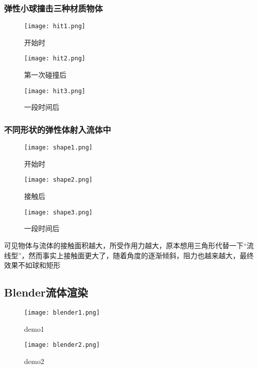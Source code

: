 \documentclass[14pt]{scrartcl} %
\begin{document}
\pagebreak
\subsubsection{弹性小球撞击三种材质物体}
\begin{figure}[htbp]
	\centering
	\texttt{[image: hit1.png]} %
	\caption{开始时}
	\centering
	\texttt{[image: hit2.png]} %
	\caption{第一次碰撞后}
	\centering
	\texttt{[image: hit3.png]} %
	\caption{一段时间后}
\end{figure}

\pagebreak
\subsubsection{不同形状的弹性体射入流体中}
\begin{figure}[htbp]
	\centering
	\texttt{[image: shape1.png]} %
	\caption{开始时}
	
\end{figure}
\pagebreak
\begin{figure}[htbp]
	\centering
	\texttt{[image: shape2.png]} %
	\caption{接触后}
\end{figure}
\pagebreak
\begin{figure}[htbp]
	\centering
	\texttt{[image: shape3.png]} %
	\caption{一段时间后}
\end{figure}

可见物体与流体的接触面积越大，所受作用力越大，原本想用三角形代替一下“流线型”，然而事实上接触面更大了，随着角度的逐渐倾斜，阻力也越来越大，最终效果不如球和矩形

\pagebreak

\subsection{Blender流体渲染}

\begin{figure}[htbp]
	\centering
	\texttt{[image: blender1.png]} %
	\caption{demo1}
\end{figure}

\begin{figure}[htbp]
	\centering
	\texttt{[image: blender2.png]} %
	\caption{demo2}
\end{figure}

\pagebreak



\end{document}
